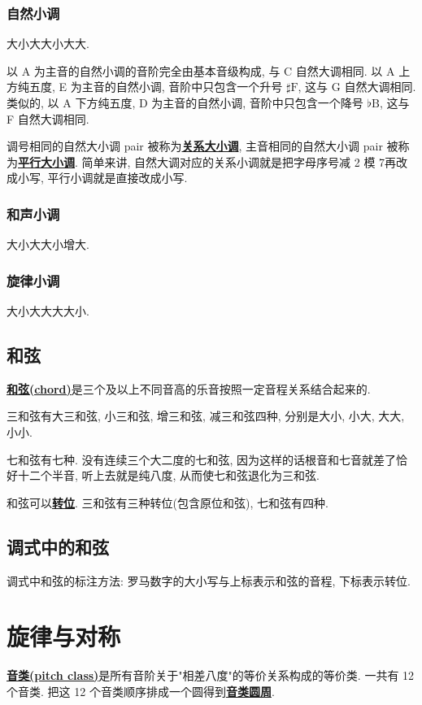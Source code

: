\documentclass[8pt]{article}
\theoremstyle{compact}
\def\obj#1{\textbf{\uline{#1}}}
\def\B{\textrm{B}}
\def\F{\textrm{F}}
\begin{document}
\subsubsection{自然小调}
大小大大小大大.

以 A 为主音的自然小调的音阶完全由基本音级构成, 与 C 自然大调相同. 以 A 上方纯五度, E 为主音的自然小调, 音阶中只包含一个升号 $\sharp\F$, 这与 G 自然大调相同. 类似的, 以 A 下方纯五度, D 为主音的自然小调, 音阶中只包含一个降号 $\flat\B$, 这与 F 自然大调相同.

调号相同的自然大小调 pair 被称为\obj{关系大小调}, 主音相同的自然大小调 pair 被称为\obj{平行大小调}. 简单来讲, 自然大调对应的关系小调就是把字母序号减 2 模 7再改成小写, 平行小调就是直接改成小写.

\subsubsection{和声小调}
大小大大小增大.
\subsubsection{旋律小调}
大小大大大大小.

\subsection{和弦}
\obj{和弦(chord)}是三个及以上不同音高的乐音按照一定音程关系结合起来的.

三和弦有大三和弦, 小三和弦, 增三和弦, 减三和弦四种, 分别是大小, 小大, 大大, 小小.

七和弦有七种. 没有连续三个大二度的七和弦, 因为这样的话根音和七音就差了恰好十二个半音, 听上去就是纯八度, 从而使七和弦退化为三和弦.

和弦可以\obj{转位}. 三和弦有三种转位(包含原位和弦), 七和弦有四种.

\subsection{调式中的和弦}
调式中和弦的标注方法: 罗马数字的大小写与上标表示和弦的音程, 下标表示转位.


\section{旋律与对称}

\obj{音类(pitch class)}是所有音阶关于"相差八度"的等价关系构成的等价类. 一共有 12 个音类. 把这 12 个音类顺序排成一个圆得到\obj{音类圆周}.
\end{document}
